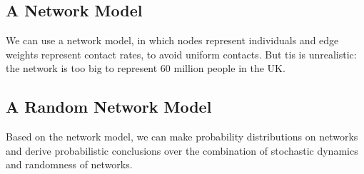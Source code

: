 \subsection{A Network Model}

\textcolor{myblue}{We can use a network model, in which nodes represent individuals and edge weights represent contact rates, to avoid uniform contacts. }\textcolor{myorange}{But tis is unrealistic: the network is too big to represent 60 million people in the UK.}

\subsection{A Random Network Model}

\textcolor{myblue}{Based on the network model, we can make probability distributions on networks and derive probabilistic conclusions over the combination of stochastic dynamics and randomness of networks.}
